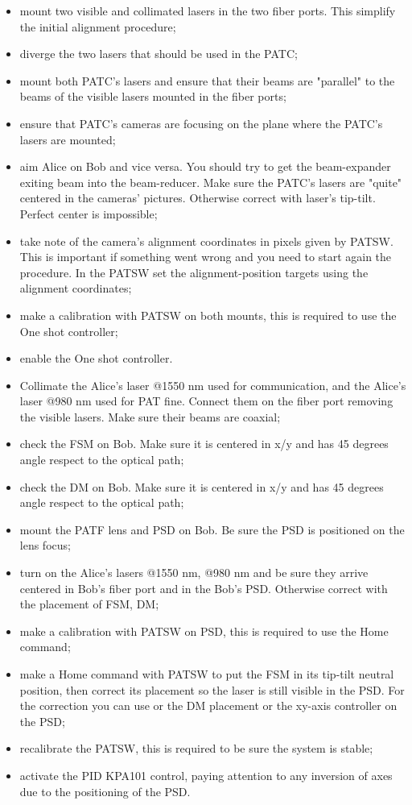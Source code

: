 \begin{itemize}
  \item mount two visible and collimated lasers in the two fiber ports. This simplify the initial alignment procedure;
  \item diverge the two lasers that should be used in the PATC;
  \item mount both PATC's lasers and ensure that their beams are "parallel" to the beams of the visible lasers mounted in the fiber ports;
  \item ensure that PATC's cameras are focusing on the plane where the PATC's lasers are mounted;
  \item aim Alice on Bob and vice versa. You should try to get the beam-expander exiting beam into the beam-reducer. Make sure the PATC's lasers are "quite" centered in the cameras' pictures. Otherwise correct with laser's tip-tilt. Perfect center is impossible;
  \item take note of the camera's alignment coordinates in pixels given by PATSW. This is important if something went wrong and you need to start again the procedure. In the PATSW set the alignment-position targets using the alignment coordinates;
  \item make a calibration with PATSW on both mounts, this is required to use the One shot controller;
  \item enable the One shot controller.
\end{itemize}

\begin{itemize}
  \item Collimate the Alice's laser @1550 nm used for communication, and the Alice's laser @980 nm used for PAT fine. Connect them on the fiber port removing the visible lasers. Make sure their beams are coaxial;
  \item check the FSM on Bob. Make sure it is centered in x/y and has 45 degrees angle respect to the optical path;
  \item check the DM on Bob. Make sure it is centered in x/y and has 45 degrees angle respect to the optical path;
  \item mount the PATF lens and PSD on Bob. Be sure the PSD is positioned on the lens focus;
  \item turn on the Alice's lasers @1550 nm, @980 nm and be sure they arrive centered in Bob's fiber port and in the Bob's PSD. Otherwise correct with the placement of FSM, DM;
  \item make a calibration with PATSW on PSD, this is required to use the Home command;
  \item make a Home command with PATSW to put the FSM in its tip-tilt neutral position, then correct its placement so the laser is still visible in the PSD. For the correction you can use or the DM placement or the xy-axis controller on the PSD;
  \item recalibrate the PATSW, this is required to be sure the system is stable;
  \item activate the PID KPA101 control, paying attention to any inversion of axes due to the positioning of the PSD.
\end{itemize}

